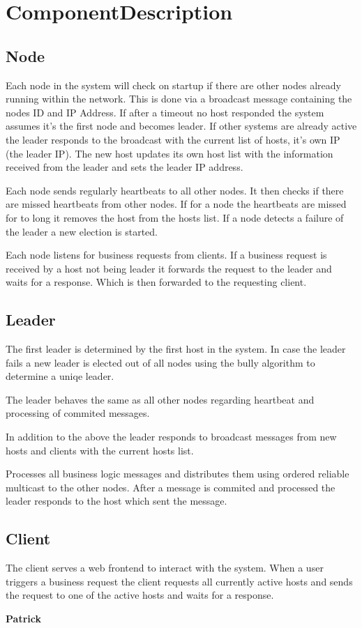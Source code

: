 \chapter{ComponentDescription}\label{ch:Component Description}
\section{Node}\label{Node}
Each node in the system will check on startup if there are other nodes already running within the network. This is done via a broadcast message containing the nodes ID and IP Address. If after a timeout no host responded the system assumes it's the first node and becomes leader. If other systems are already active the leader responds to the broadcast with the current list of hosts, it's own IP (the leader IP). The new host updates its own host list with the information received from the leader and sets the leader IP address. 

Each node sends regularly heartbeats to all other nodes. It then checks if there are missed heartbeats from other nodes. If for a node the heartbeats are missed for to long it removes the host from the hosts list.
If a node detects a failure of the leader a new election is started.

Each node listens for business requests from clients. If a business request is received by a host not being leader it forwards the request to the leader and waits for a response. Which is then forwarded to the requesting client.

\section{Leader}\label{sec:Leader}
The first leader is determined by the first host in the system. 
In case the leader fails a new leader is elected out of all nodes using the bully algorithm to determine a uniqe leader.

The leader behaves the same as all other nodes regarding heartbeat and processing of commited messages.

In addition to the above the leader responds to broadcast messages from new hosts and clients with the current hosts list.

Processes all business logic messages and distributes them using ordered reliable multicast to the other nodes. After a message is commited and processed the leader responds to the host which sent the message.



\section{Client}\label{sec:Client}
The client serves a web frontend to interact with the system. When a user triggers a business request the client requests all currently active hosts and sends the request to one of the active hosts and waits for a response. 

\textbf{Patrick}